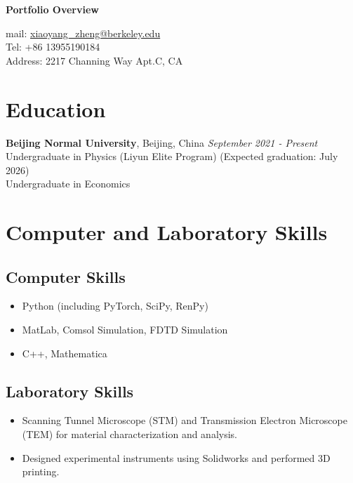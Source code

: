 \documentclass[a4paper, 12pt]{ctexart}
\begin{document}
\begin{center}
    {\Huge\bfseries Portfolio Overview} %
    \vspace{2em}

    \large
    mail: \href{mailto:xiaoyang_zheng@berkeley.edu}{xiaoyang\_zheng@berkeley.edu} \\ %
    Tel: +86 13955190184 \\ %
    Address: 2217 Channing Way Apt.C, CA %
\end{center}
\vspace{1em}


\section*{Education} %
\textbf{Beijing Normal University}, Beijing, China \hfill \textit{September 2021 - Present} \\ %
Undergraduate in Physics (Liyun Elite Program) (Expected graduation: July 2026) \\ %
Undergraduate in Economics %

\section*{Computer and Laboratory Skills} %

\subsection*{Computer Skills} %
\begin{itemize}
    \item Python (including PyTorch, SciPy, RenPy) %
    \item MatLab, Comsol Simulation, FDTD Simulation %
    \item C++, Mathematica %
\end{itemize}

\subsection*{Laboratory Skills} %
\begin{itemize}
    \item Scanning Tunnel Microscope (STM) and Transmission Electron Microscope (TEM) for material characterization and analysis. %
    \item Designed experimental instruments using Solidworks and performed 3D printing. %
\end{itemize}
\end{document}
